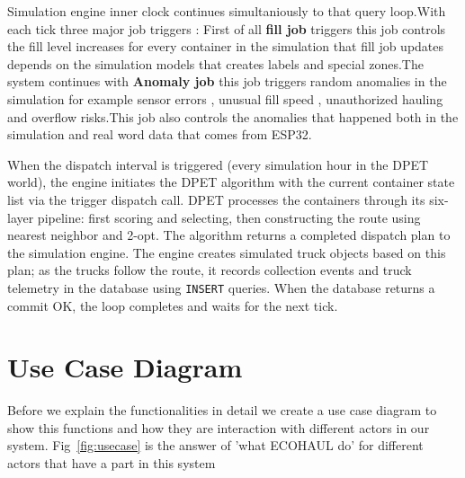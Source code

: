 \documentclass[12pt,a4paper]{report}
\begin{document}
\indent Simulation engine inner clock continues simultaniously to that query loop.With each tick three major job triggers : First of all \textbf{fill job} triggers this job controls the fill level increases for every container in the simulation that fill job updates depends on the simulation models that creates labels and special zones.The system continues with \textbf{Anomaly job} this job triggers random anomalies in the simulation for example sensor errors , unusual fill speed , unauthorized hauling  and overflow risks.This job also controls the anomalies that happened both in the simulation and real word data that comes from ESP32.

\indent When the dispatch interval is triggered (every simulation hour in the DPET world), the engine initiates the DPET algorithm with the current container state list via the trigger dispatch call. DPET processes the containers through its six-layer pipeline: first scoring and selecting, then constructing the route using nearest neighbor and 2-opt. The algorithm returns a completed dispatch plan to the simulation engine. The engine creates simulated truck objects based on this plan; as the trucks follow the route, it records collection events and truck telemetry in the database using \texttt{INSERT} queries. When the database returns a commit OK, the loop completes and waits for the next tick.

\section{Use Case Diagram}

\indent Before we explain the functionalities in detail we create a use case diagram to show this functions and how they are interaction with different actors in our system. Fig~\ref{fig:usecase} is the answer of  'what ECOHAUL do' for different actors that have a part in this system
\end{document}
